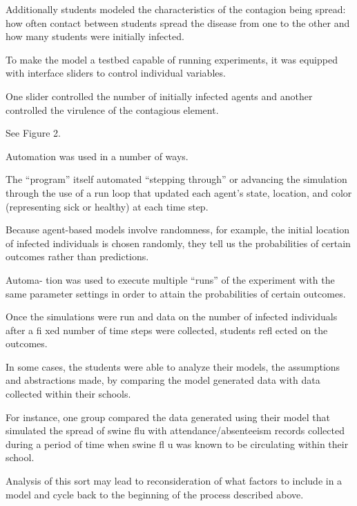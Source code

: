 Additionally students modeled the characteristics of the contagion being spread: how often contact between students spread the disease from one to the other and how many students were initially infected.

To make the model a testbed capable of running experiments, it was equipped with interface sliders to control individual variables.

One slider controlled the number of initially infected agents and another controlled the virulence of the contagious element.

See Figure 2.
 

Automation was used in a number of ways.

The “program” itself automated “stepping through” or advancing the simulation through the use of a run loop that updated each agent’s state, location, and color (representing sick or healthy) at each time step.

Because agent-based models involve randomness, for example, the initial location of infected individuals is chosen randomly, they tell us the probabilities of certain outcomes rather than predictions.

Automa- tion was used to execute multiple “runs” of the experiment with the same parameter settings in order to attain the probabilities of certain outcomes.

Once the simulations were run and data on the number of infected individuals after a fi xed number of time steps were collected, students refl ected on the outcomes.

In some cases, the students were able to analyze their models, the assumptions and abstractions made, by comparing the model generated data with data collected within their schools.

For instance, one group compared the data generated using their model that simulated the spread of swine flu with attendance/absenteeism records collected during a period of time when swine fl u was known to be circulating within their school.

Analysis of this sort may lead to reconsideration of what factors to include in a model and cycle back to the beginning of the process described above.

